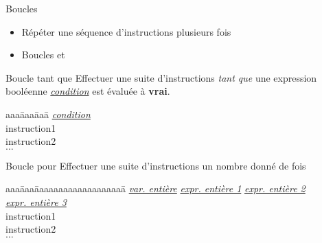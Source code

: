  \begin{frame}{Boucles}
   \begin{itemize}
   \item Répéter une séquence d'instructions plusieurs fois
   \item Boucles {} et {}
   \end{itemize}
 \end{frame}

 \begin{frame}{Boucle tant que}
   Effectuer une suite d'instructions \emph{tant que} une expression booléenne \underline{\emph{condition}} est évaluée à \textbf{vrai}.
     
   \begin{tabbing}
     aaa\=aaa\=aaa\=\kill
     {} \underline{\emph{condition}} {} \\
     \> instruction1 \\
     \> instruction2 \\
     \> $\ldots$ \\
     {}
   \end{tabbing}
 \end{frame}
 
 \begin{frame}{Boucle pour}
   Effectuer une suite d'instructions un nombre donné de fois
~\\
   \begin{tabbing}
     aaa\=aaa\=aaaaaaaaaaaaaaaaaaa\=\kill
     {} \underline{\emph{var. entière}}
     {} \underline{\emph{expr. entière 1}}
     {} \underline{\emph{expr. entière 2}} \\
     \>\>\>  \underline{\emph{expr. entière 3}} {} \\
     \> instruction1 \\
     \> instruction2 \\
     \> $\ldots$ \\
     {}
   \end{tabbing}
\end{frame}


